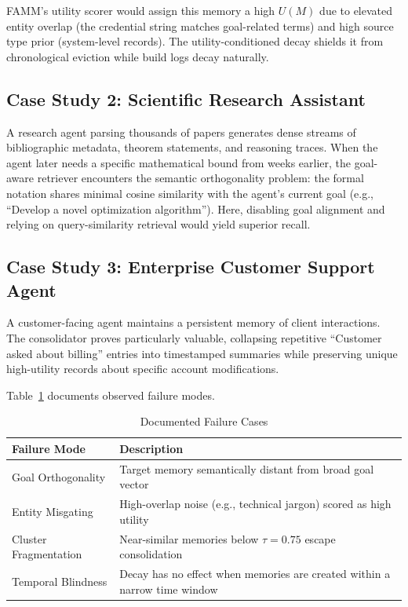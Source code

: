 \documentclass[conference]{IEEEtran}
\begin{document}
FAMM's utility scorer would assign this memory a high $U(M)$ due to elevated entity overlap (the credential string matches goal-related terms) and high source type prior (system-level records). The utility-conditioned decay shields it from chronological eviction while build logs decay naturally.

\subsection{Case Study 2: Scientific Research Assistant}
A research agent parsing thousands of papers generates dense streams of bibliographic metadata, theorem statements, and reasoning traces. When the agent later needs a specific mathematical bound from weeks earlier, the goal-aware retriever encounters the semantic orthogonality problem: the formal notation shares minimal cosine similarity with the agent's current goal (e.g., ``Develop a novel optimization algorithm''). Here, disabling goal alignment and relying on query-similarity retrieval would yield superior recall.

\subsection{Case Study 3: Enterprise Customer Support Agent}
A customer-facing agent maintains a persistent memory of client interactions. The consolidator proves particularly valuable, collapsing repetitive ``Customer asked about billing'' entries into timestamped summaries while preserving unique high-utility records about specific account modifications.

Table~\ref{tab:failures} documents observed failure modes.

\begin{table}[htbp]
\caption{Documented Failure Cases}
\label{tab:failures}
\begin{center}
\small
\begin{tabular}{lp{4.5cm}}
\toprule
\textbf{Failure Mode} & \textbf{Description} \\
\midrule
Goal Orthogonality & Target memory semantically distant from broad goal vector \\
Entity Misgating & High-overlap noise (e.g., technical jargon) scored as high utility \\
Cluster Fragmentation & Near-similar memories below $\tau{=}0.75$ escape consolidation \\
Temporal Blindness & Decay has no effect when memories are created within a narrow time window \\
\bottomrule
\end{tabular}
\end{center}
\end{table}
\end{document}
